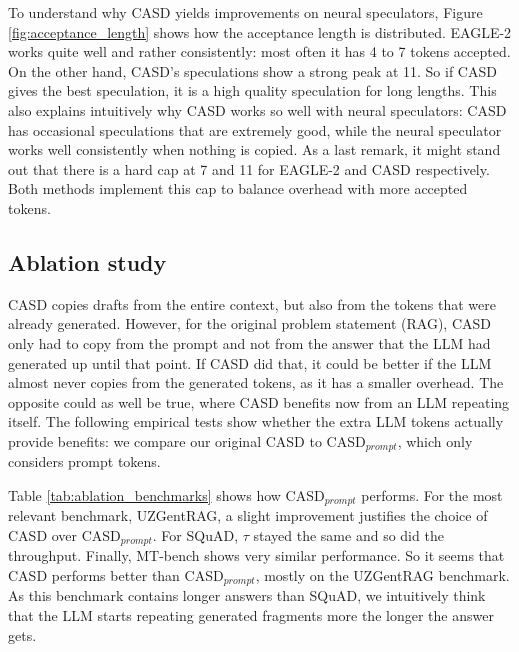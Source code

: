 To understand why CASD yields improvements on neural speculators, Figure \ref{fig:acceptance_length} shows how the acceptance length is distributed. EAGLE-2 works quite well and rather consistently: most often it has 4 to 7 tokens accepted. On the other hand, CASD's speculations show a strong peak at 11. So if CASD gives the best speculation, it is a high quality speculation for long lengths. This also explains intuitively why CASD works so well with neural speculators: CASD has occasional speculations that are extremely good, while the neural speculator works well consistently when nothing is copied. As a last remark, it might stand out that there is a hard cap at 7 and 11 for EAGLE-2 and CASD respectively. Both methods implement this cap to balance overhead with more accepted tokens.

\subsection{Ablation study}

CASD copies drafts from the entire context, but also from the tokens that were already generated. However, for the original problem statement (RAG), CASD only had to copy from the prompt and not from the answer that the LLM had generated up until that point. If CASD did that, it could be better if the LLM almost never copies from the generated tokens, as it has a smaller overhead. The opposite could as well be true, where CASD benefits now from an LLM repeating itself. The following empirical tests show whether the extra LLM tokens actually provide benefits: we compare our original CASD to CASD$_{prompt}$, which only considers prompt tokens.

Table \ref{tab:ablation_benchmarks} shows how CASD$_{prompt}$ performs. For the most relevant benchmark, UZGentRAG, a slight improvement justifies the choice of CASD over CASD$_{prompt}$. For SQuAD, $\tau$ stayed the same and so did the throughput. Finally, MT-bench shows very similar performance. So it seems that CASD performs better than CASD$_{prompt}$, mostly on the UZGentRAG benchmark. As this benchmark contains longer answers than SQuAD, we intuitively think that the LLM starts repeating generated fragments more the longer the answer gets.

